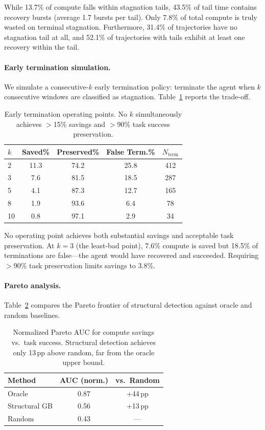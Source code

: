 \documentclass[11pt,a4paper]{article}
\begin{document}
While 13.7\% of compute falls within stagnation tails, 43.5\% of tail time contains recovery bursts (average 1.7 bursts per tail).
Only 7.8\% of total compute is truly wasted on terminal stagnation.
Furthermore, 31.4\% of trajectories have no stagnation tail at all, and 52.1\% of trajectories with tails exhibit at least one recovery within the tail.

\paragraph{Early termination simulation.}
We simulate a consecutive-$k$ early termination policy: terminate the agent when $k$ consecutive windows are classified as stagnation.
Table~\ref{tab:termination} reports the trade-off.

\begin{table}[t]
\centering
\small
\begin{tabular}{lcccc}
\toprule
\textbf{$k$} & \textbf{Saved\%} & \textbf{Preserved\%} & \textbf{False Term.\%} & \textbf{$N_{\text{term}}$} \\
\midrule
2 & 11.3 & 74.2 & 25.8 & 412 \\
3 & 7.6 & 81.5 & 18.5 & 287 \\
5 & 4.1 & 87.3 & 12.7 & 165 \\
8 & 1.9 & 93.6 & 6.4 & 78 \\
10 & 0.8 & 97.1 & 2.9 & 34 \\
\bottomrule
\end{tabular}
\caption{Early termination operating points. No $k$ simultaneously achieves $>$15\% savings and $>$90\% task success preservation.}
\label{tab:termination}
\end{table}

No operating point achieves both substantial savings and acceptable task preservation.
At $k{=}3$ (the least-bad point), 7.6\% compute is saved but 18.5\% of terminations are false---the agent would have recovered and succeeded.
Requiring $>$90\% task preservation limits savings to 3.8\%.

\paragraph{Pareto analysis.}
Table~\ref{tab:pareto} compares the Pareto frontier of structural detection against oracle and random baselines.

\begin{table}[t]
\centering
\small
\begin{tabular}{lcc}
\toprule
\textbf{Method} & \textbf{AUC (norm.)} & \textbf{vs.\ Random} \\
\midrule
Oracle & 0.87 & +44\,pp \\
Structural GB & 0.56 & +13\,pp \\
Random & 0.43 & --- \\
\bottomrule
\end{tabular}
\caption{Normalized Pareto AUC for compute savings vs.\ task success. Structural detection achieves only 13\,pp above random, far from the oracle upper bound.}
\label{tab:pareto}
\end{table}
\end{document}

